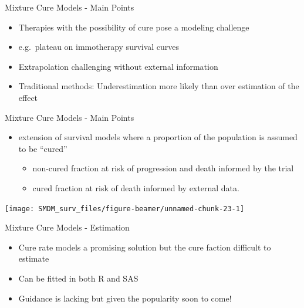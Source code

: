 \documentclass[
  ignorenonframetext,
]{beamer}
\providecommand{\tightlist}{%
  \setlength{\itemsep}{0pt}\setlength{\parskip}{0pt}}
\begin{document}
\begin{frame}{Mixture Cure Models - Main Points}
\protect\hypertarget{mixture-cure-models---main-points}{}

\begin{itemize}
\tightlist
\item
  Therapies with the possibility of cure pose a modeling challenge
\item
  e.g.~plateau on immotherapy survival curves
\item
  Extrapolation challenging without external information
\item
  Traditional methods: Underestimation more likely than over estimation
  of the effect
\end{itemize}

\end{frame}

\begin{frame}{Mixture Cure Models - Main Points}
\protect\hypertarget{mixture-cure-models---main-points-1}{}

\begin{itemize}
\tightlist
\item
  extension of survival models where a proportion of the population is
  assumed to be ``cured''

  \begin{itemize}
  \tightlist
  \item
    non-cured fraction at risk of progression and death informed by the
    trial
  \item
    cured fraction at risk of death informed by external data.
  \end{itemize}
\end{itemize}

\texttt{[image: SMDM\_surv\_files/figure-beamer/unnamed-chunk-23-1]}

\end{frame}

\begin{frame}{Mixture Cure Models - Estimation}
\protect\hypertarget{mixture-cure-models---estimation}{}

\begin{itemize}
\item
  Cure rate models a promising solution but the cure faction difficult
  to estimate
\item
  Can be fitted in both R and SAS
\item
  Guidance is lacking but given the popularity soon to come!
\end{itemize}

\end{frame}
\end{document}
